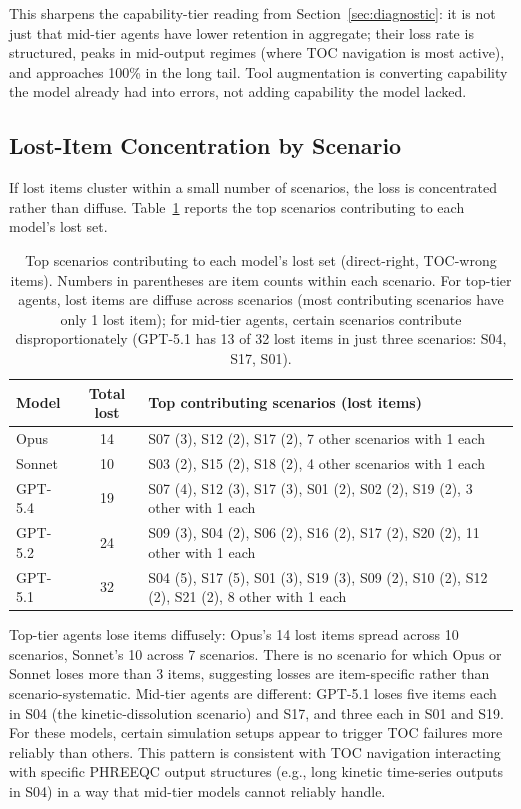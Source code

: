 \documentclass{article}
\begin{document}
This sharpens the capability-tier reading from Section~\ref{sec:diagnostic}: it is not just that mid-tier agents have lower retention in aggregate; their loss rate is structured, peaks in mid-output regimes (where TOC navigation is most active), and approaches 100\% in the long tail. Tool augmentation is converting capability the model already had into errors, not adding capability the model lacked.

\subsection{Lost-Item Concentration by Scenario}

If lost items cluster within a small number of scenarios, the loss is concentrated rather than diffuse. Table~\ref{tab:appendix-lost-by-scenario} reports the top scenarios contributing to each model's lost set.

\begin{table}[h]
\centering
\small
\setlength{\tabcolsep}{4pt}
\caption{Top scenarios contributing to each model's lost set (direct-right, TOC-wrong items). Numbers in parentheses are item counts within each scenario. For top-tier agents, lost items are diffuse across scenarios (most contributing scenarios have only 1 lost item); for mid-tier agents, certain scenarios contribute disproportionately (GPT-5.1 has 13 of 32 lost items in just three scenarios: S04, S17, S01).}
\label{tab:appendix-lost-by-scenario}
\begin{tabular}{lcl}
\toprule
Model & Total lost & Top contributing scenarios (lost items) \\
\midrule
Opus & 14 & S07 (3), S12 (2), S17 (2), 7 other scenarios with 1 each \\
Sonnet & 10 & S03 (2), S15 (2), S18 (2), 4 other scenarios with 1 each \\
GPT-5.4 & 19 & S07 (4), S12 (3), S17 (3), S01 (2), S02 (2), S19 (2), 3 other with 1 each \\
GPT-5.2 & 24 & S09 (3), S04 (2), S06 (2), S16 (2), S17 (2), S20 (2), 11 other with 1 each \\
GPT-5.1 & 32 & S04 (5), S17 (5), S01 (3), S19 (3), S09 (2), S10 (2), S12 (2), S21 (2), 8 other with 1 each \\
\bottomrule
\end{tabular}
\end{table}

Top-tier agents lose items diffusely: Opus's 14 lost items spread across 10 scenarios, Sonnet's 10 across 7 scenarios. There is no scenario for which Opus or Sonnet loses more than 3 items, suggesting losses are item-specific rather than scenario-systematic. Mid-tier agents are different: GPT-5.1 loses five items each in S04 (the kinetic-dissolution scenario) and S17, and three each in S01 and S19. For these models, certain simulation setups appear to trigger TOC failures more reliably than others. This pattern is consistent with TOC navigation interacting with specific PHREEQC output structures (e.g., long kinetic time-series outputs in S04) in a way that mid-tier models cannot reliably handle.
\end{document}
